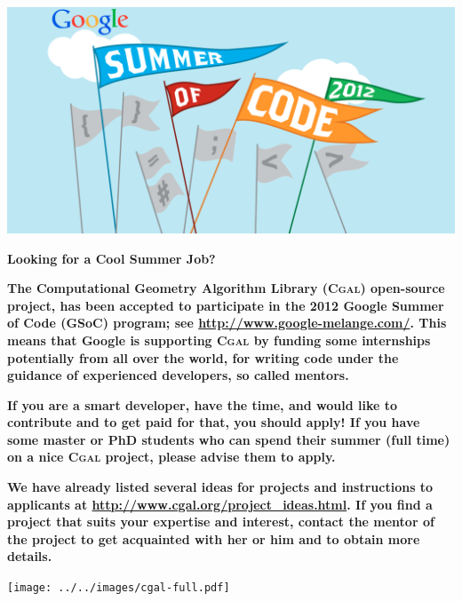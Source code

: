 \documentclass[12pt,a4paper]{article}
\newcommand{\cgal}{\textsc{Cgal}}
\begin{document}
\begin{framed}
  \newlength{\cgalwidth}\setlength{\cgalwidth}{\linewidth}
  \begin{center}
    \includegraphics[width=\cgalwidth]{GSoC2012.pdf}

    \textbf{\Huge Looking for a Cool Summer Job?}
  \end{center}

  \textbf{\large The Computational Geometry Algorithm Library (\cgal{})
    open-source project, has been accepted to participate in the 2012 Google
    Summer of Code (GSoC) program; see \url{http://www.google-melange.com/}.
    This means that Google is supporting \cgal{} by funding some internships
    potentially from all over the world, for writing code under the guidance
    of experienced developers, so called mentors.}

  \textbf{\large If you are a smart developer, have the time, and
    would like to contribute and to get paid for that, you should
    apply! If you have some master or PhD students who can spend their
    summer (full time) on a nice \cgal{} project, please advise them
    to apply.}

  \textbf{\large We have already listed several ideas for projects and
    instructions to applicants at
    \url{http://www.cgal.org/project_ideas.html}. If you find a project
    that suits your expertise and interest, contact the mentor of the
    project to get acquainted with her or him and to obtain more details.}

  \texttt{[image: ../../images/cgal-full.pdf]}
\end{framed}
\end{document}
